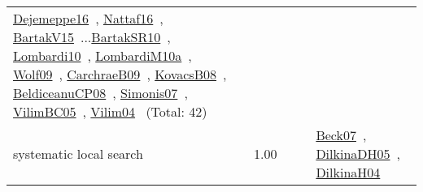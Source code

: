 {\begin{longtable}{p{3cm}r>{\raggedright\arraybackslash}p{6cm}>{\raggedright\arraybackslash}p{6cm}>{\raggedright\arraybackslash}p{8cm}}
\href{../works/Dejemeppe16.pdf}{Dejemeppe16}~\cite{Dejemeppe16}, \href{../works/Nattaf16.pdf}{Nattaf16}~\cite{Nattaf16}, \href{../works/BartakV15.pdf}{BartakV15}~\cite{BartakV15}...\href{../works/BartakSR10.pdf}{BartakSR10}~\cite{BartakSR10}, \href{../works/Lombardi10.pdf}{Lombardi10}~\cite{Lombardi10}, \href{../works/LombardiM10a.pdf}{LombardiM10a}~\cite{LombardiM10a}, \href{../works/Wolf09.pdf}{Wolf09}~\cite{Wolf09}, \href{../works/CarchraeB09.pdf}{CarchraeB09}~\cite{CarchraeB09}, \href{../works/KovacsB08.pdf}{KovacsB08}~\cite{KovacsB08}, \href{../works/BeldiceanuCP08.pdf}{BeldiceanuCP08}~\cite{BeldiceanuCP08}, \href{../works/Simonis07.pdf}{Simonis07}~\cite{Simonis07}, \href{../works/VilimBC05.pdf}{VilimBC05}~\cite{VilimBC05}, \href{../works/Vilim04.pdf}{Vilim04}~\cite{Vilim04} (Total: 42)\\
\index{systematic local search}\index{Algorithms!systematic local search}systematic local search &  1.00 &  &  & \href{../works/Beck07.pdf}{Beck07}~\cite{Beck07}, \href{../works/DilkinaDH05.pdf}{DilkinaDH05}~\cite{DilkinaDH05}, \href{../works/DilkinaH04.pdf}{DilkinaH04}~\cite{DilkinaH04}\\

\end{longtable}}
